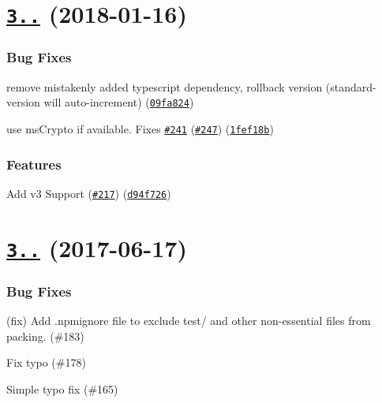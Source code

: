 \label{_3.2.0}%
 \section*{\href{https://github.com/kelektiv/node-uuid/compare/v3.1.0...v3.2.0}{\tt 3..} (2018-\/01-\/16)}

\subsubsection*{Bug Fixes}


\begin{DoxyItemize}
\item remove mistakenly added typescript dependency, rollback version (standard-\/version will auto-\/increment) (\href{https://github.com/kelektiv/node-uuid/commit/09fa824}{\tt 09fa824})
\item use ms\+Crypto if available. Fixes \href{https://github.com/kelektiv/node-uuid/issues/241}{\tt \#241} (\href{https://github.com/kelektiv/node-uuid/issues/247}{\tt \#247}) (\href{https://github.com/kelektiv/node-uuid/commit/1fef18b}{\tt 1fef18b})
\end{DoxyItemize}

\subsubsection*{Features}


\begin{DoxyItemize}
\item Add v3 Support (\href{https://github.com/kelektiv/node-uuid/issues/217}{\tt \#217}) (\href{https://github.com/kelektiv/node-uuid/commit/d94f726}{\tt d94f726})
\end{DoxyItemize}

\section*{\href{https://github.com/kelektiv/node-uuid/compare/v3.1.0...v3.0.1}{\tt 3..} (2017-\/06-\/17)}

\subsubsection*{Bug Fixes}


\begin{DoxyItemize}
\item (fix) Add .npmignore file to exclude test/ and other non-\/essential files from packing. (\#183)
\item Fix typo (\#178)
\item Simple typo fix (\#165)
\end{DoxyItemize}

